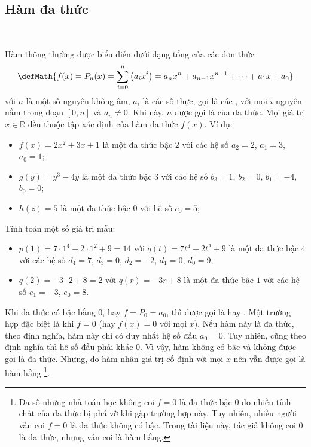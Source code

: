 \subsection{Hàm đa thức}

\ %

Hàm  thông thường được biểu diễn dưới dạng tổng của các đơn thức $$\defMath{f(x)=P_n(x)=\sum_{i = 0}^n \left(a_i x^i\right) = a_nx^n + a_{n-1}x^{n-1} + \cdots + a_1x + a_0}$$ với $n$ là một số nguyên không âm, $a_i$ là các số thực, gọi là các , với mọi $i$ nguyên nằm trong đoạn $[0, n]$ và $a_n \neq 0$. Khi này, $n$ được gọi là  của đa thức\label{def:ham_so_mot_bien:da_thuc:da_thuc}. Mọi giá trị $x \in \mathbb{R}$ đều thuộc tập xác định của hàm đa thức $f(x)$. Ví dụ:
\begin{itemize}
   \item $f(x) = 2x^2 + 3x + 1$ là một đa thức bậc $2$ với các hệ số $a_2 = 2$, $a_1 = 3$, $a_0 = 1$;
   \item $g(y) = y^3 - 4y$ là một đa thức bậc $3$ với các hệ số $b_3 = 1$, $b_2 = 0$, $b_1 = -4$, $b_0 = 0$;
   \item $h(z) = 5$ là một đa thức bậc $0$ với hệ số $c_0 = 5$;
\end{itemize}
Tính toán một số giá trị mẫu:
\begin{itemize}
   \item $p(1) = 7 \cdot 1^4 - 2 \cdot 1^2 + 9 = 14$ với $q(t)= 7t^4 - 2t^2 + 9$ là một đa thức bậc $4$ với các hệ số $d_4 = 7$, $d_3 = 0$, $d_2 = -2$, $d_1 = 0$, $d_0 = 9$;
   \item $q(2) = -3 \cdot 2 + 8 = 2$ với $q(r) = -3r + 8$ là một đa thức bậc $1$ với các hệ số $e_1 = -3$, $e_0 = 8$.
\end{itemize}
Khi đa thức có bậc bằng $0$, hay $f = P_0 = a_0$, thì được gọi là  hay . Một trường hợp đặc biệt là khi $f = 0$ (hay $f(x) = 0$ với mọi $x$). Nếu hàm này là đa thức, theo định nghĩa, hàm này chỉ có duy nhất hệ số đầu $a_0 = 0$. Tuy nhiên, cũng theo định nghĩa thì hệ số đầu phải khác $0$. Vì vậy, hàm không có bậc và không được gọi là đa thức. Nhưng, do hàm nhận giá trị cố định với mọi $x$ nên vẫn được gọi là hàm hằng \footnote{Đa số những nhà toán học không coi $f = 0$ là đa thức bậc $0$ do nhiều tính chất của đa thức bị phá vỡ khi gặp trường hợp này. Tuy nhiên, nhiều người vẫn coi $f = 0$ là đa thức không có bậc. Trong tài liệu này, tác giả không coi $0$ là đa thức, nhưng vẫn coi là hàm hằng.}.

